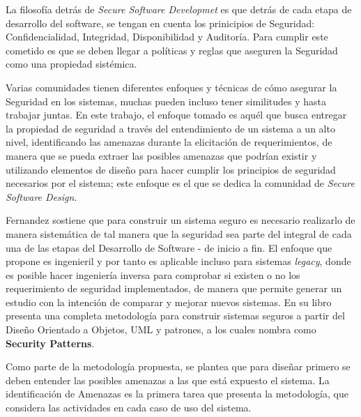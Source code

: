 La filosofía detrás de \textit{Secure Software Developmet} es que detrás de cada etapa de desarrollo del software, se tengan en cuenta los prinicipios de Seguridad: Confidencialidad, Integridad, Disponibilidad y Auditoría. Para cumplir este cometido es que se deben llegar a políticas y reglas que aseguren la Seguridad como una propiedad sistémica.

Varias comunidades tienen diferentes enfoques y técnicas de cómo asegurar la Seguridad en los sistemas, muchas pueden incluso tener similitudes y hasta trabajar juntas. En este trabajo, el enfoque tomado es aquél que busca entregar la propiedad de seguridad a través del entendimiento de un sistema a un alto nivel, identificando las amenazas durante la elicitación de requerimientos, de manera que se pueda extraer las posibles amenazas que podrían existir y utilizando elementos de diseño para hacer cumplir los principios de seguridad necesarios por el sistema; este enfoque es el que se dedica la comunidad de \textit{Secure Software Design}. 

Fernandez \cite{Fernandez2011a,fernandez2013security} sostiene que para construir un sistema seguro es necesario realizarlo de manera sistemática de tal manera que la seguridad sea parte del integral de cada una de las etapas del Desarrollo de Software - de inicio a fin. El enfoque que propone es ingenieril y por tanto es aplicable incluso para sistemas \textit{legacy}, donde es posible hacer ingeniería inversa para comprobar si existen o no los requerimiento de seguridad implementados, de manera que permite generar un estudio con la intención de comparar y mejorar nuevos sistemas. En su libro \cite{fernandez2013security} presenta una completa metodología para construir sistemas seguros a partir del Diseño Orientado a Objetos, UML y patrones, a los cuales nombra como \textbf{Security Patterns}.

Como parte de la metodología propuesta, se plantea que para diseñar primero se deben entender las posibles amenazas a las que está expuesto el sistema. La identificación de Amenazas \cite{braz2008eliciting,fernandez2006defining} es la primera tarea que presenta la metodología, que considera las actividades en cada caso de uso del sistema.


